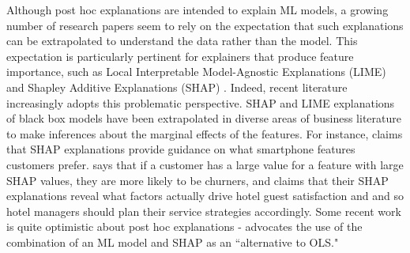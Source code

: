\documentclass[mnsc,blindrev]{informs3}
\begin{document}
Although post hoc explanations are intended to explain ML models, a growing number of research papers seem to rely on the expectation that such explanations can be extrapolated to understand the data rather than the model. This expectation is particularly pertinent for explainers that produce feature importance, such as Local Interpretable Model-Agnostic Explanations (LIME) \citep{ribeiro16lime} and Shapley Additive Explanations (SHAP) \citep{lundberg17shap}.
Indeed, recent literature increasingly adopts this problematic perspective. SHAP and LIME explanations of black box models have been extrapolated in diverse areas of business literature to make inferences about the marginal effects of the features. For instance, \cite{park2024extracting} claims that SHAP explanations provide guidance on what smartphone features customers prefer. \cite{jiang24churn} says that if a customer has a large value for a feature with large SHAP values, they are more likely to be churners, and \cite{sanchez2023role} claims that their SHAP explanations reveal what factors actually drive hotel guest satisfaction and and so hotel managers should plan their service strategies accordingly. Some recent work is quite optimistic about post hoc explanations - \cite{berger2023supply} advocates the use of the combination of an ML model and SHAP as an ``alternative to OLS."
\end{document}
